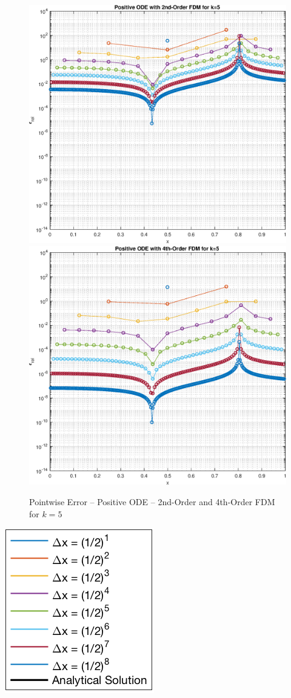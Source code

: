 \documentclass[10pt, reqno]{article}		%
\numberwithin{equation}{section}
\begin{document}
\begin{figure}[H]
	\begin{center}
		\includegraphics[width = 0.49\linewidth]{error_positive_ode_order_2_k_5}
		\includegraphics[width = 0.49\linewidth]{error_positive_ode_order_4_k_5}
		\caption{Pointwise Error -- Positive ODE -- 2nd-Order and 4th-Order FDM for $k = 5$}
	\end{center}
\end{figure}

\begin{center}
	\includegraphics[height = 0.25\linewidth]{legend}
\end{center}

\newpage
\end{document}
